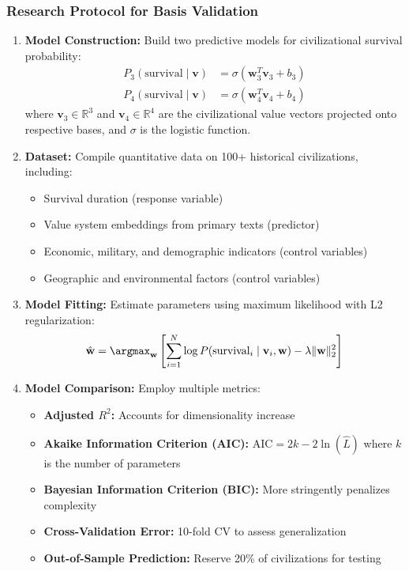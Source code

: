 \documentclass[11pt,a4paper]{article}
\theoremstyle{definition}
\theoremstyle{remark}
\begin{document}
\begin{small}
\subsubsection{Research Protocol for Basis Validation}

\begin{enumerate}
    \item \textbf{Model Construction:} Build two predictive models for civilizational survival probability:
    \begin{align}
        P_3(\text{survival} \mid \mathbf{v}) &= \sigma(\mathbf{w}_3^T \mathbf{v}_3 + b_3) \\
        P_4(\text{survival} \mid \mathbf{v}) &= \sigma(\mathbf{w}_4^T \mathbf{v}_4 + b_4)
    \end{align}
    where \(\mathbf{v}_3 \in \mathbb{R}^3\) and \(\mathbf{v}_4 \in \mathbb{R}^4\) are the civilizational value vectors projected onto respective bases, and \(\sigma\) is the logistic function.
    
    \item \textbf{Dataset:} Compile quantitative data on 100+ historical civilizations, including:
    \begin{itemize}
        \item Survival duration (response variable)
        \item Value system embeddings from primary texts (predictor)
        \item Economic, military, and demographic indicators (control variables)
        \item Geographic and environmental factors (control variables)
    \end{itemize}
    
    \item \textbf{Model Fitting:} Estimate parameters using maximum likelihood with L2 regularization:
    \begin{equation}
        \hat{\mathbf{w}} = \argmax_{\mathbf{w}} \left[\sum_{i=1}^{N} \log P(\text{survival}_i \mid \mathbf{v}_i, \mathbf{w}) - \lambda \|\mathbf{w}\|_2^2\right]
    \end{equation}
    
    \item \textbf{Model Comparison:} Employ multiple metrics:
    \begin{itemize}
        \item \textbf{Adjusted \(R^2\):} Accounts for dimensionality increase
        \item \textbf{Akaike Information Criterion (AIC):} \(\text{AIC} = 2k - 2\ln(\hat{L})\) where \(k\) is the number of parameters
        \item \textbf{Bayesian Information Criterion (BIC):} More stringently penalizes complexity
        \item \textbf{Cross-Validation Error:} 10-fold CV to assess generalization
        \item \textbf{Out-of-Sample Prediction:} Reserve 20\% of civilizations for testing
    \end{itemize}
    

\end{enumerate}
\end{small}
\end{document}
